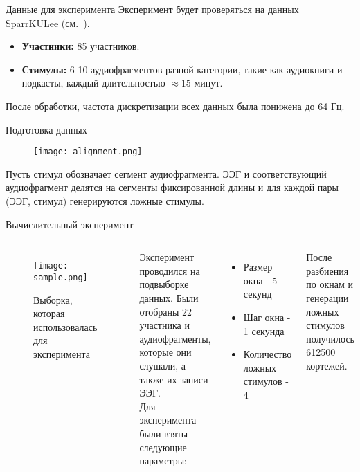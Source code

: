 \documentclass{beamer}
\begin{document}
\begin{frame}{Данные для эксперимента}
Эксперимент будет проверяться на данных SparrKULee (см.~\citep{K3VSND_2023}).
\begin{itemize}
     \item \textbf{Участники:} 85 участников.
    \item \textbf{Стимулы:} 6-10 аудиофрагментов разной категории, такие как аудиокниги и подкасты, каждый длительностью  $\approx15$ минут.
\end{itemize}
\bigskip
После обработки, частота дискретизации всех данных была понижена до 64 Гц.
\end{frame}

\begin{frame}{Подготовка данных}
\begin{figure}[t]
    \centering
    \texttt{[image: alignment.png]}
\end{figure}
Пусть стимул обозначает сегмент аудиофрагмента. ЭЭГ и соответствующий аудиофрагмент делятся на сегменты фиксированной длины и для каждой пары (ЭЭГ, стимул) генерируются ложные стимулы.
\end{frame}

\begin{frame}{Вычислительный эксперимент}
\begin{columns}[c]
\begin{figure}
    \texttt{[image: sample.png]}
    \caption{Выборка, которая использовалась для эксперимента}
\end{figure}
Эксперимент проводился на подвыборке данных. Были отобраны 22 участника и аудиофрагменты, которые они слушали, а также их записи ЭЭГ. \\
Для эксперимента были взяты следующие параметры: 
\begin{itemize}
    \item Размер окна - 5 секунд
    \item Шаг окна - 1 секунда 
    \item Количество ложных стимулов - 4
\end{itemize}
После разбиения по окнам и генерации ложных стимулов получилось 612500 кортежей.
\end{columns}

\end{frame}
\end{document}
